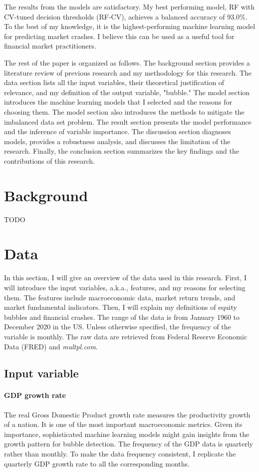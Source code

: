 \documentclass[12pt, man, a4paper, floatsintext]{apa7}
\begin{document}
The results from the models are satisfactory. My best performing model, RF with CV-tuned decision thresholds (RF-CV), achieves a balanced accuracy of 93.0\%. To the best of my knowledge, it is the highest-performing machine learning model for predicting market crashes. I believe this can be used as a useful tool for financial market practitioners.

The rest of the paper is organized as follows. The background section provides a literature review of previous research and my methodology for this research. The data section lists all the input variables, their theoretical justification of relevance, and my definition of the output variable, "bubble." The model section introduces the  machine learning models that I selected and the reasons for choosing them. The model section also introduces the methods to mitigate the imbalanced data set problem. The result section presents the model performance and the inference of variable importance. The discussion section diagnoses models, provides a robustness analysis, and discusses the limitation of the research. Finally, the conclusion section summarizes the key findings and the contributions of this research.

    \section{Background}
    TODO %

    \section{Data}

In this section, I will give an overview of the data used in this research. First, I will introduce the input variables, a.k.a., features, and my reasons for selecting them. The features include macroeconomic data, market return trends, and market fundamental indicators. Then, I will explain my definitions of equity bubbles and financial crashes. The range of the data is from January 1960 to December 2020 in the US. Unless otherwise specified, the frequency of the variable is monthly. The raw data are retrieved from Federal Reserve Economic Data (FRED) and \emph{multpl.com}.

\subsection{Input variable}

\paragraph{GDP growth rate} The real Gross Domestic Product growth rate measures the productivity growth of a nation. It is one of the most important macroeconomic metrics. Given its importance, sophisticated machine learning models might gain insights from the growth pattern for bubble detection. The frequency of the GDP data is quarterly rather than monthly. To make the data frequency consistent, I replicate the quarterly GDP growth rate to all the corresponding months.
\end{document}
